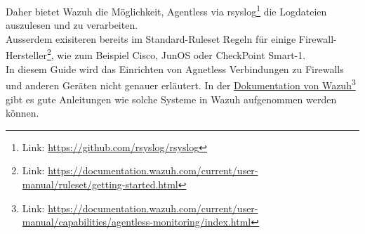 Daher bietet Wazuh die Möglichkeit, Agentless via rsyslog\footnote{Link: \href{https://github.com/rsyslog/rsyslog}{https://github.com/rsyslog/rsyslog}} die Logdateien auszulesen und zu verarbeiten.\\

Ausserdem exisiteren bereits im Standard-Ruleset Regeln für einige Firewall-Hersteller\footnote{Link: \href{https://documentation.wazuh.com/current/user-manual/ruleset/getting-started.html}{https://documentation.wazuh.com/current/user-manual/ruleset/getting-started.html}}, wie zum Beispiel Cisco, JunOS oder CheckPoint Smart-1.\\

In diesem Guide wird das Einrichten von Agnetless Verbindungen zu Firewalls und anderen Geräten nicht genauer erläutert.
In der \href{https://documentation.wazuh.com/current/user-manual/capabilities/agentless-monitoring/index.html}{Dokumentation von Wazuh}\footnote{Link: \href{https://documentation.wazuh.com/current/user-manual/capabilities/agentless-monitoring/index.html}{https://documentation.wazuh.com/current/user-manual/capabilities/agentless-monitoring/index.html}} gibt es gute Anleitungen wie solche Systeme in Wazuh aufgenommen werden können.